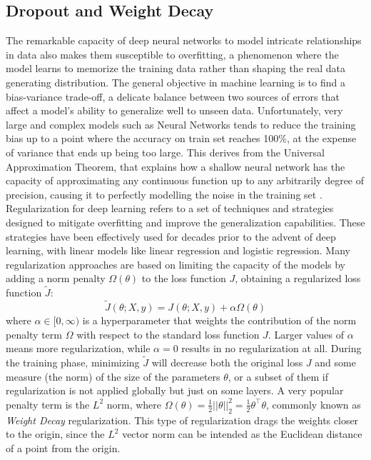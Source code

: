 \documentclass[binding=0.7cm, oneside]{sapthesis}
\begin{document}
\subsection{Dropout and Weight Decay}
The remarkable capacity of deep neural networks to model intricate relationships in data also makes them susceptible to overfitting, a phenomenon where the model learns to memorize the training data rather than shaping the real data generating distribution. The general objective in machine learning is to find a bias-variance trade-off, a delicate balance between two sources of errors that affect a model's ability to generalize well to unseen data. Unfortunately,
very large and complex models such as Neural Networks tends to reduce the training bias up to a point where the accuracy on train set reaches 100\%, at the expense of variance that ends up being too large. This derives from the Universal Approximation Theorem, that explains how a shallow neural network has the capacity of approximating any continuous function up to any arbitrarily degree of precision, causing it to perfectly modelling the noise in the training set \cite{overfitting}.
Regularization for deep learning refers to a set of techniques and strategies designed to mitigate overfitting and improve the generalization capabilities. These strategies have been effectively used for decades prior to the advent of deep learning, with linear models like linear regression and logistic regression. Many regularization approaches are based on limiting the capacity of the models by adding a norm penalty $\Omega(\theta)$ to the loss function $J$, obtaining a regularized
loss function $\tilde{J}$:
$$\tilde{J}(\theta; X, y) = J(\theta; X, y) + \alpha\Omega(\theta)$$
where $\alpha \in [0, \infty)$ is a hyperparameter that weights the contribution of the norm penalty term $\Omega$ with respect to the standard loss function $J$. Larger values of $\alpha$ means more regularization, while $\alpha = 0$ results in no regularization at all.
During the training phase, minimizing $\tilde{J}$ will decrease both the original loss $J$ and some measure (the norm) of the size of the parameters $\theta$, or a subset of them if regularization is not applied globally but just on some layers.
A very popular penalty term is the $L^2$ norm, where $\Omega(\theta) = \frac{1}{2}||\theta||^{2}_{2} = \frac{1}{2}\theta^\top\theta$, commonly known as \emph{Weight Decay} regularization. This type of regularization drags the weights closer to the origin, since the $L^2$ vector norm can be intended as the Euclidean distance of a point from the origin.
\end{document}
